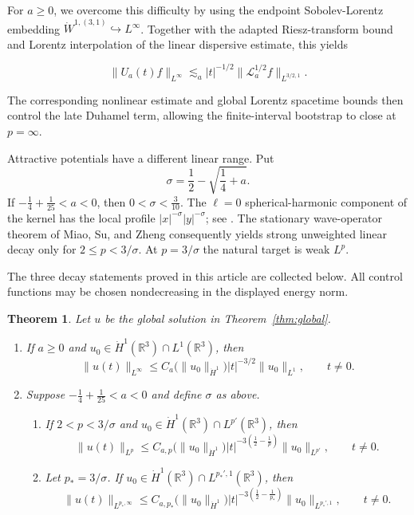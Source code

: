 \documentclass[preprint,12pt]{elsarticle}
\numberwithin{equation}{section}
\newtheorem{theorem}{Theorem}[section]
\theoremstyle{definition}
\theoremstyle{remark}
\newcommand{\R}{\mathbb R}
\newcommand{\norm}[2]{\lVert #1\rVert_{#2}}
\begin{document}
For $a\ge0$, we overcome this difficulty by using the endpoint Sobolev-Lorentz embedding $\dot W^{1,(3,1)}\hookrightarrow L^\infty$. Together with the adapted Riesz-transform bound and Lorentz interpolation of the linear dispersive estimate, this yields

\[
\|U_a(t)f\|_{L^\infty}
\lesssim_a |t|^{-1/2}
\|\mathcal L_a^{1/2}f\|_{L^{3/2,1}}.
\]

The corresponding nonlinear estimate and global Lorentz spacetime bounds then control the late Duhamel term, allowing the finite-interval bootstrap to close at $p=\infty$.

Attractive potentials have a different linear range. Put
\[
 \sigma=\frac12-\sqrt{\frac14+a}.
\]
If $-\frac14+\frac1{25}<a<0$, then $0<\sigma<\frac3{10}$. The
$\ell=0$ spherical-harmonic component of the kernel has the local
profile $|x|^{-\sigma}|y|^{-\sigma}$; see \cite[Eqs. (1.24), (1.27) and Section 6]{FanelliDecay}. The stationary wave-operator
theorem of Miao, Su, and Zheng \cite{MiaoSuZheng} consequently yields
strong unweighted linear decay only for $2\leq p<3/\sigma$. At
$p=3/\sigma$ the natural target is weak $L^p$.

The three decay statements proved in this article are collected below.
All control functions may be chosen nondecreasing in the displayed
energy norm.

\begin{theorem}
\label{thm:main}
Let $u$ be the global solution in Theorem~\ref{thm:global}.
\begin{enumerate}
 \item If $a\geq0$ and $u_0\in\dot H^1(\R^3)\cap L^1(\R^3)$, then
 \begin{equation}
  \norm{u(t)}{L^\infty}
  \leq C_a\bigl(\norm{u_0}{\dot H^1}\bigr)
  |t|^{-3/2}\norm{u_0}{L^1},
  \qquad t\neq0.
  \label{eq:nonnegative-endpoint}
 \end{equation}
 \item Suppose $-\frac14+\frac1{25}<a<0$ and define $\sigma$ as
 above.
 \begin{enumerate}
  \item If $2<p<3/\sigma$ and
  $u_0\in\dot H^1(\R^3)\cap L^{p'}(\R^3)$, then
  \begin{equation}
   \norm{u(t)}{L^p}
   \leq C_{a,p}\bigl(\norm{u_0}{\dot H^1}\bigr)
   |t|^{-3(\frac12-\frac1p)}\norm{u_0}{L^{p'}},
   \qquad t\neq0.
   \label{eq:attractive-strong}
  \end{equation}
  \item Let $p_*=3/\sigma$. If
  $u_0\in\dot H^1(\R^3)\cap L^{p_*',1}(\R^3)$, then
  \begin{equation}
   \norm{u(t)}{L^{p_*,\infty}}
   \leq C_{a,p_*}\bigl(\norm{u_0}{\dot H^1}\bigr)
   |t|^{-3(\frac12-\frac1{p_*})}
   \norm{u_0}{L^{p_*',1}},
   \qquad t\neq0.
   \label{eq:attractive-endpoint}
  \end{equation}
 \end{enumerate}
\end{enumerate}
\end{theorem}
\end{document}
